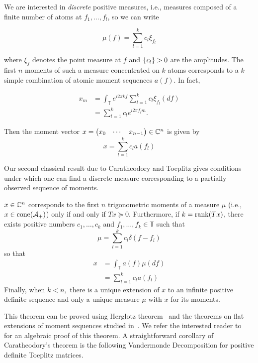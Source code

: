 We are interested in \emph{discrete} positive measures, i.e., measures composed
of a finite number of atoms at $f_1, \ldots, f_l$, so we can write

\[
\mu(f) = \sum_{l=1}^k c_l \xi_{f_l}
\]

where $\xi_f$ denotes the point measure at $f$ and $\left\{ c_l \right\} > 0$ are the
amplitudes. The first $n$ moments of such a measure concentrated on $k$ atoms
corresponds to a $k$ simple combination of atomic moment sequences $a(f).$ In
fact,

\begin{align*}
	x_m &= \int_\mathbb{T} e^{i 2 \pi k f} \sum_{l=1}^k c_l \xi_{f_l}(d f)\\
	&= \sum_{l=1}^k c_l e^{i 2 \pi f_l m}.
\end{align*}

Then the moment vector
$x = \begin{pmatrix}x_0 & \cdots & x_{n-1}\end{pmatrix} \in \mathbb{C}^n$ is given by
\[
x = \sum_{l=1}^k c_l a(f_l)
\]

Our second classical result due to Caratheodory and Toeplitz gives conditions
under which one can find a discrete measure corresponding to a partially
observed sequence of moments.

\begin{theorem}
\label{thm:caratheodory-toeplitz}
	$x \in \mathbb{C}^n$ corresponds to the first $n$ trigonometric moments of a measure $\mu$ (i.e., $x \in \operatorname{cone}(\mathcal{A}_+)$) only if and only if $T x \succeq 0.$ Furthermore, if $k = \operatorname{rank}(T x)$, there exists positive numbers $c_1, \ldots, c_k$ and $f_1, \ldots, f_k \in \mathbb{T}$ such  that
\[
	\mu = \sum_{l=1}^k c_l \delta(f - f_l)
\]
so that
\begin{align*}
	x &= \int_{\mathbb{T}} a(f) \mu(df)\\
	& = \sum_{l=1}^k c_l a(f_l)
\end{align*}
Finally, when $k < n,$ there is a unique extension of $x$ to an infinite positive definite sequence and only a unique measure $\mu$ with $x$ for its moments.
\end{theorem}

This theorem can be proved using Herglotz theorem~\cite{herglotz} and the
theorems on flat extensions of moment sequences studied in~\cite{Curto97}. We
refer the interested reader to~\cite{grenander01} for an algebraic proof of this
theorem. A straightforward corollary of Caratheodory's theorem is the following
Vandermonde Decomposition for positive definite Toeplitz matrices.

